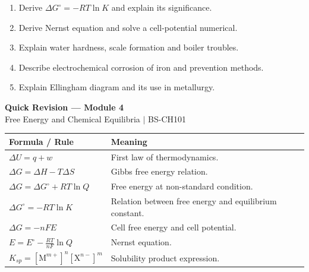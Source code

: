 \documentclass[12pt,a4paper]{article}
\begin{document}
\begin{tcolorbox}[masonbox, title={Previous-Year Style Questions}]
\begin{enumerate}[leftmargin=*, itemsep=4pt, topsep=2pt]
  \item Derive $\Delta G^\circ=-RT\ln K$ and explain its significance.
  \item Derive Nernst equation and solve a cell-potential numerical.
  \item Explain water hardness, scale formation and boiler troubles.
  \item Describe electrochemical corrosion of iron and prevention methods.
  \item Explain Ellingham diagram and its use in metallurgy.
\end{enumerate}
\end{tcolorbox}
\newpage
\begin{center}
  {\large\bfseries\color{myred} Quick Revision --- Module 4}\\[3pt]
  {\small\color{mydark} Free Energy and Chemical Equilibria $|$ BS-CH101}
\end{center}
\noindent{\color{myred}\rule{\linewidth}{1.2pt}}
\vspace{4pt}

\begin{tcolorbox}[formulabox, title={Key Formulas at a Glance}]
\begin{tabularx}{\linewidth}{|B{4.0cm}|Y|}
\hline
\textbf{Formula / Rule} & \textbf{Meaning} \\
\hline
$\Delta U=q+w$ & First law of thermodynamics. \\
\hline
$\Delta G=\Delta H-T\Delta S$ & Gibbs free energy relation. \\
\hline
$\Delta G=\Delta G^\circ+RT\ln Q$ & Free energy at non-standard condition. \\
\hline
$\Delta G^\circ=-RT\ln K$ & Relation between free energy and equilibrium constant. \\
\hline
$\Delta G=-nFE$ & Cell free energy and cell potential. \\
\hline
$E=E^\circ-\displaystyle\frac{RT}{nF}\ln Q$ & Nernst equation. \\
\hline
$K_{sp}=[\mathrm{M}^{m+}]^n[\mathrm{X}^{n-}]^m$ & Solubility product expression. \\
\hline
\end{tabularx}
\end{tcolorbox}
\end{document}

